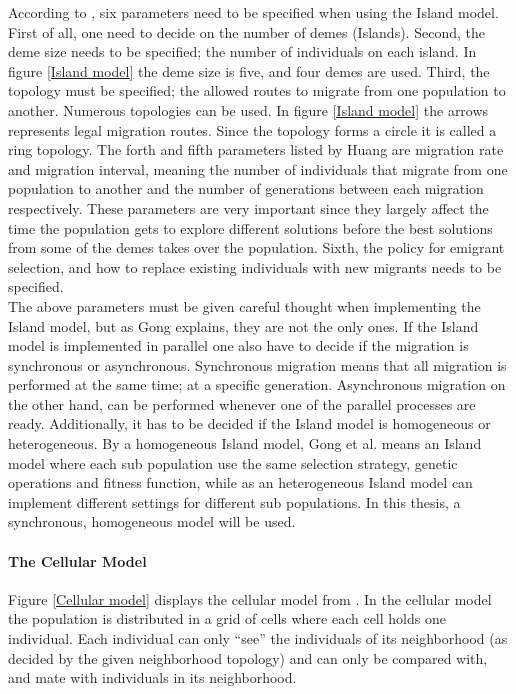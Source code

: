 \noindent According to \cite{Huang}, six parameters need to be specified when using the Island model. First of all, one need to decide on the number of demes (Islands). Second, the deme size needs to be specified; the number of individuals on each island. In figure \ref{Island model} the deme size is five, and four demes are used. Third, the topology must be specified; the allowed routes to migrate from one population to another. Numerous topologies can be used. In figure \ref{Island model} the arrows represents legal migration routes. Since the topology forms a circle it is called a ring topology. The forth and fifth parameters listed by Huang are migration rate and migration interval, meaning the number of individuals that migrate from one population to another and the number of generations between each migration respectively. These parameters are very important since they largely affect the time the population gets to explore different solutions before the best solutions from some of the demes takes over the population. Sixth, the policy for emigrant selection, and how to replace existing individuals with new migrants needs to be specified. \\


\noindent The above parameters must be given careful thought when implementing the Island model, but as Gong explains, they are not the only ones. If the Island model is implemented in parallel one also have to decide if the migration is synchronous or asynchronous. Synchronous migration means that all migration is performed at the same time; at a specific generation. Asynchronous migration on the other hand, can be performed whenever one of the parallel processes are ready. Additionally, it has to be decided if the Island model is homogeneous or heterogeneous. By a homogeneous Island model, Gong et al. means an Island model where each sub population use the same selection strategy, genetic operations and fitness function, while as an heterogeneous Island model can implement different settings for different sub populations. In this thesis, a synchronous, homogeneous model will be used.


\paragraph*{The Cellular Model}
Figure \ref{Cellular model} displays the cellular model from \cite{Gong}. In the cellular model the population is distributed in a grid of cells where each cell holds one individual. Each individual can only ``see'' the individuals of its neighborhood (as decided by the given neighborhood topology) and can only be compared with, and mate with individuals in its neighborhood. \\


